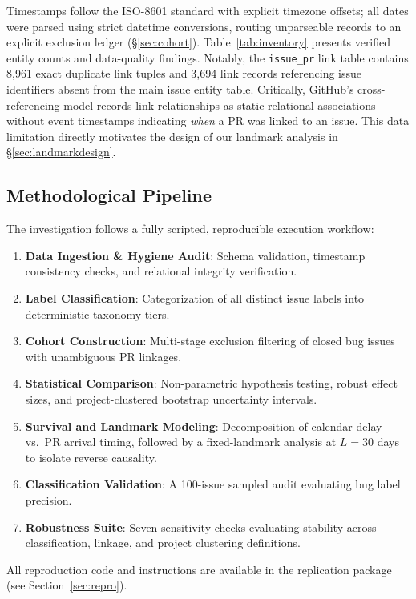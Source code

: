 Timestamps follow the ISO-8601 standard with explicit timezone offsets; all dates were parsed using strict datetime conversions, routing unparseable records to an explicit exclusion ledger (\S\ref{sec:cohort}). Table~\ref{tab:inventory} presents verified entity counts and data-quality findings. Notably, the \texttt{issue\_pr} link table contains 8,961 exact duplicate link tuples and 3,694 link records referencing issue identifiers absent from the main issue entity table. Critically, GitHub's cross-referencing model records link relationships as static relational associations without event timestamps indicating \emph{when} a PR was linked to an issue. This data limitation directly motivates the design of our landmark analysis in \S\ref{sec:landmarkdesign}.



\subsection{Methodological Pipeline}\label{sec:approach}
The investigation follows a fully scripted, reproducible execution workflow:
\begin{enumerate}
  \item \textbf{Data Ingestion \& Hygiene Audit}: Schema validation, timestamp consistency checks, and relational integrity verification.
  \item \textbf{Label Classification}: Categorization of all \vallabelsTotal{} distinct issue labels into deterministic taxonomy tiers.
  \item \textbf{Cohort Construction}: Multi-stage exclusion filtering of closed bug issues with unambiguous PR linkages.
  \item \textbf{Statistical Comparison}: Non-parametric hypothesis testing, robust effect sizes, and project-clustered bootstrap uncertainty intervals.
  \item \textbf{Survival and Landmark Modeling}: Decomposition of calendar delay vs.\ PR arrival timing, followed by a fixed-landmark analysis at $L=30$ days to isolate reverse causality.
  \item \textbf{Classification Validation}: A 100-issue sampled audit evaluating bug label precision.
  \item \textbf{Robustness Suite}: Seven sensitivity checks evaluating stability across classification, linkage, and project clustering definitions.
\end{enumerate}
All reproduction code and instructions are available in the replication package (see Section~\ref{sec:repro}).
